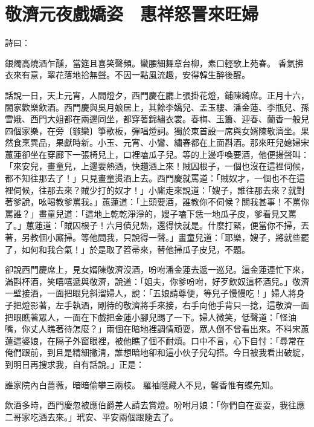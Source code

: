 %

\chapter{敬濟元夜戲嬌姿　惠祥怒詈來旺婦}

詩曰：

銀燭高燒酒乍醺，當筵且喜笑聲頻。蠻腰細舞章台柳，素口輕歌上苑春。
香氣拂衣來有意，翠花落地拾無聲。不因一點風流趣，安得韓生醉後醒。

話說一日，天上元宵，人間燈夕，西門慶在廳上張掛花燈，鋪陳綺席。正月十六，閤家歡樂飲酒。西門慶與吳月娘居上，其餘李嬌兒、孟玉樓、潘金蓮、李瓶兒、孫雪娥、西門大姐都在兩邊同坐，都穿著錦繡衣裳。春梅、玉簫、迎春、蘭香一般兒四個家樂，在旁〔镞欒〕箏歌板，彈唱燈詞。獨於東首設一席與女婿陳敬濟坐。果然食烹異品，果獻時新。小玉、元宵、小鸞、繡春都在上面斟酒。那來旺兒媳婦宋蕙蓮卻坐在穿廊下一張椅兒上，口裡嗑瓜子兒。等的上邊呼喚要酒，他便揚聲叫： 「來安兒，畫童兒，上邊要熱酒，快趲酒上來！賊囚根子，一個也沒在這裡伺候，都不知往那去了！」只見畫童燙酒上去。西門慶就罵道：「賊奴才，一個也不在這裡伺候，往那去來？賊少打的奴才！」小廝走來說道：「嫂子，誰往那去來？就對著爹說，吆喝教爹罵我。」蕙蓮道：「上頭要酒，誰教你不伺候？關我甚事！不罵你罵誰？」畫童兒道：「這地上乾乾淨淨的，嫂子嗑下恁一地瓜子皮，爹看見又罵了。」蕙蓮道：「賊囚根子！六月債兒熱，還得快就是。什麼打緊，便當你不掃，丟著，另教個小廝掃。等他問我，只說得一聲。」畫童兒道：「耶樂，嫂子，將就些罷了，如何和我合氣！」於是取了笤帚來，替他掃瓜子皮兒，不題。

卻說西門慶席上，見女婿陳敬濟沒酒，吩咐潘金蓮去遞一巡兒。這金蓮連忙下來，滿斟杯酒，笑嘻嘻遞與敬濟，說道：「姐夫，你爹吩咐，好歹飲奴這杯酒兒。」敬濟一壁接酒，一面把眼兒斜溜婦人，說：「五娘請尊便，等兒子慢慢吃！」婦人將身子把燈影著，左手執酒，剛待的敬濟將手來接，右手向他手背只一捻，這敬濟一面把眼瞧著眾人，一面在下戲把金蓮小腳兒踢了一下。婦人微笑，低聲道：「怪油嘴，你丈人瞧著待怎麼？」兩個在暗地裡調情頑耍，眾人倒不曾看出來。不料宋蕙蓮這婆娘，在隔子外窗眼裡，被他瞧了個不耐煩。口中不言，心下自忖：「尋常在俺們跟前，到且是精細撇清，誰想暗地卻和這小伙子兒勾搭。今日被我看出破綻，到明日再搜求我，自有話說。」正是：

誰家院內白薔薇，暗暗偷攀三兩枝。
羅袖隱藏人不見，馨香惟有蝶先知。

飲酒多時，西門慶忽被應伯爵差人請去賞燈。吩咐月娘：「你們自在耍耍，我往應二哥家吃酒去來。」玳安、平安兩個跟隨去了。

